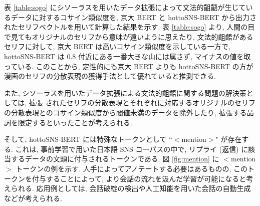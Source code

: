 表 \ref{table:sogo} にシソーラスを用いたデータ拡張によって文法的齟齬が生じているデータに対するコサイン類似度を, 京大 BERT と hottoSNS-BERT から出力されたセリフベクトルを用いて計算した結果を示す. 表 \ref{table:sogo} より, 人間の目で見てもオリジナルのセリフから意味が遠いように思えたり, 文法的齟齬があるセリフに対して, 京大 BERT は高いコサイン類似度を示している一方で, hottoSNS-BERT は $0.8$ 付近にある一番大きな山には属さず, マイナスの値を取っている. このことから, 定性的にも京大 BERT よりも hottoSNS-BERT の方が漫画のセリフの分散表現の獲得手法として優れていると推測できる.

\begin{table}[!h]
\vspace{20mm}
\caption{シソーラスを用いたデータ拡張による文法的齟齬}
\label{table:sogo}
\centering
{}
\vspace{10mm}
\end{table}

\newpage

また, シソーラスを用いたデータ拡張による文法的齟齬に関する問題の解決策としては, 拡張
されたセリフの分散表現とそれぞれに対応するオリジナルのセリフの分散表現とのコサイン類似度から閾値未満のデータを除外したり, 拡張する品詞を限定するといったことが考えられる.

そして, hottoSNS-BERT には特殊なトークンとして ``$<$mention$>$" が存在する. これは, 事前学習で用いた日本語 SNS コーパスの中で, リプライ (返信) に該当するデータの文頭に付与されるトークンである. 図 \ref{fig:mention} に $<$mention$>$ トークンの例を示す. 人手によってアノテートする必要はあるものの, このトークンを付与することによって, より会話の流れを汲んだ学習が可能になると考えられる. 応用例としては, 会話破綻の検出や人工知能を用いた会話の自動生成などが考えられる.

